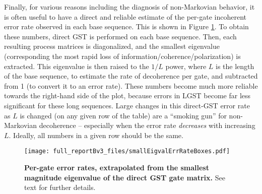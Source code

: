 {Finally, for various reasons including the diagnosis of non-Markovian behavior, it is often useful to have a direct and reliable estimate of the per-gate incoherent error rate observed in each base sequence.  This is shown in Figure \ref{smallEigvalErrRateColorBoxPlot}.  To obtain these numbers, direct GST is performed on each base sequence.  Then, each resulting process matrices is diagonalized, and the smallest eigenvalue (corresponding the most rapid loss of information/coherence/polarization) is extracted.  This eigenvalue is then raised to the $1/L$ power, where $L$ is the length of the base sequence, to estimate the rate of decoherence per gate, and subtracted from 1 (to convert it to an error rate).  These numbers become much more reliable towards the right-hand side of the plot, because errors in LGST become far less significant for these long sequences.  Large changes in this direct-GST error rate as $L$ is changed (on any given row of the table) are a ``smoking gun'' for non-Markovian decoherence -- especially when the error rate \emph{decreases} with increasing $L$.  Ideally, all numbers in a given row should be the same.

\begin{figure}
\begin{center}
\texttt{[image: full\_reportBv3\_files/smallEigvalErrRateBoxes.pdf]}
\caption{\textbf{Per-gate error rates, extrapolated from the smallest magnitude eigenvalue of the direct GST gate matrix.}  See text for further details.\label{smallEigvalErrRateColorBoxPlot}}
\end{center}
\end{figure}

}{}

